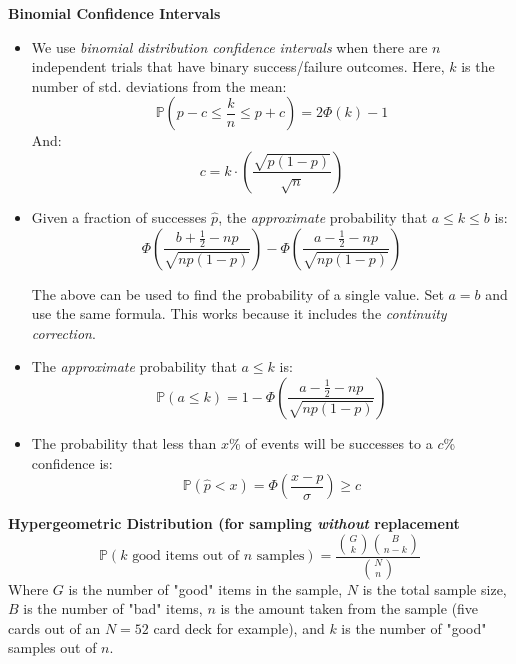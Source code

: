\documentclass[titlepage, 12pt, leqno]{article}
\begin{document}
\pagebreak
\begin{multicols}{2}
    \textbf{Binomial Confidence Intervals}
    \begin{itemize}
        \item We use \textit{binomial distribution confidence intervals} when 
            there are $n$ independent trials that have binary success/failure
            outcomes. Here, $k$ is the number of std. deviations from the mean:
            \[
                \mathbb{P}(p-c \le \frac{k}{n} \le p+c) = 2\Phi(k)-1
            \]
            And:
            \[
                c = k \cdot \left(\frac{\sqrt{p(1-p)}}{\sqrt{n}}\right)
            \]
        \item Given a fraction of successes $\hat p$, the \textit{approximate}
            probability that $a \le k \le b$ is:
            \[
                \Phi\left(\frac{b+\frac{1}{2}-np}{\sqrt{np(1-p)}}\right) -
                \Phi\left(\frac{a-\frac{1}{2}-np}{\sqrt{np(1-p)}}\right)
            \]
            \begin{note}
            The above can be used to find the probability of a single value. Set
            $a=b$ and use the same formula. This works because it includes
            the \textit{continuity correction}.
            \end{note}
            
        \item The \textit{approximate} probability that $a \le k$ is:
            \[
                \mathbb{P}(a \le k) = 1-\Phi\left(\frac{a-\frac{1}{2}-
                np}{\sqrt{np(1-p)}}\right)
            \]
        \item The probability that less than $x$\% of events will be successes to
            a $c$\% confidence is:
            \[
            \mathbb{P}(\hat p < x) = \Phi\left(\frac{x-p}{\sigma}\right) \ge c
            \]
            
    \end{itemize}

\textbf{Hypergeometric Distribution (for sampling \textit{without} replacement}
\[
    \mathbb{P}(k \text{ good items out of }n \text{ samples}) =
    \frac{\binom{G}{k}\binom{B}{n-k}}{\binom{N}{n}}
\]
Where $G$ is the number of "good" items in the sample, $N$ is the total sample
size, $B$ is the number of "bad" items, $n$ is the amount taken from the sample
(five cards out of an $N=52$ card deck for example), and $k$ is the number of
"good" samples out of $n$.


\end{multicols}
\end{document}
